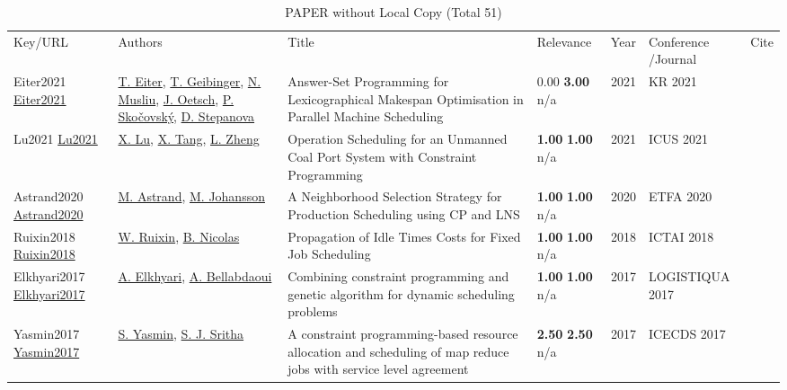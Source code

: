 {\scriptsize
\begin{longtable}{p{3cm}p{5cm}p{10cm}p{1cm}rp{2.5cm}l}
\rowcolor{white}\caption{PAPER without Local Copy (Total 51)}\\ \toprule
\rowcolor{white}Key/URL & Authors & Title & Relevance &Year & \shortstack{Conference\\/Journal} & Cite\\ \midrule
\endhead
\bottomrule
\endfoot
Eiter2021 \href{http://dx.doi.org/10.24963/kr.2021/27}{Eiter2021} & \hyperref[auth:a1960]{T. Eiter}, \hyperref[auth:a77]{T. Geibinger}, \hyperref[auth:a45]{N. Musliu}, \hyperref[auth:a1961]{J. Oetsch}, \hyperref[auth:a1962]{P. Skočovský}, \hyperref[auth:a1963]{D. Stepanova} & Answer-Set Programming for Lexicographical Makespan Optimisation in Parallel Machine Scheduling & \noindent{}\textcolor{black!50}{0.00} \textbf{3.00} n/a & 2021 & KR 2021 & \cite{Eiter2021}\\
Lu2021 \href{http://dx.doi.org/10.1109/icus52573.2021.9641241}{Lu2021} & \hyperref[auth:a1250]{X. Lu}, \hyperref[auth:a2059]{X. Tang}, \hyperref[auth:a1252]{L. Zheng} & Operation Scheduling for an Unmanned Coal Port System with Constraint Programming & \noindent{}\textbf{1.00} \textbf{1.00} n/a & 2021 & ICUS 2021 & \cite{Lu2021}\\
Astrand2020 \href{http://dx.doi.org/10.1109/etfa46521.2020.9212047}{Astrand2020} & \hyperref[auth:a1709]{M. Astrand}, \hyperref[auth:a75]{M. Johansson} & A Neighborhood Selection Strategy for Production Scheduling using CP and LNS & \noindent{}\textbf{1.00} \textbf{1.00} n/a & 2020 & ETFA 2020 & \cite{Astrand2020}\\
Ruixin2018 \href{http://dx.doi.org/10.1109/ictai.2018.00113}{Ruixin2018} & \hyperref[auth:a1629]{W. Ruixin}, \hyperref[auth:a1630]{B. Nicolas} & \cellcolor{green!10}Propagation of Idle Times Costs for Fixed Job Scheduling & \noindent{}\textbf{1.00} \textbf{1.00} n/a & 2018 & ICTAI 2018 & \cite{Ruixin2018}\\
Elkhyari2017 \href{http://dx.doi.org/10.1109/logistiqua.2017.7962867}{Elkhyari2017} & \hyperref[auth:a292]{A. Elkhyari}, \hyperref[auth:a2053]{A. Bellabdaoui} & Combining constraint programming and genetic algorithm for dynamic scheduling problems & \noindent{}\textbf{1.00} \textbf{1.00} n/a & 2017 & LOGISTIQUA 2017 & \cite{Elkhyari2017}\\
Yasmin2017 \href{http://dx.doi.org/10.1109/icecds.2017.8390131}{Yasmin2017} & \hyperref[auth:a1907]{S. Yasmin}, \hyperref[auth:a1908]{S. J. Sritha} & A constraint programming-based resource allocation and scheduling of map reduce jobs with service level agreement & \noindent{}\textbf{2.50} \textbf{2.50} n/a & 2017 & ICECDS 2017 & \cite{Yasmin2017}\\

\end{longtable}}
